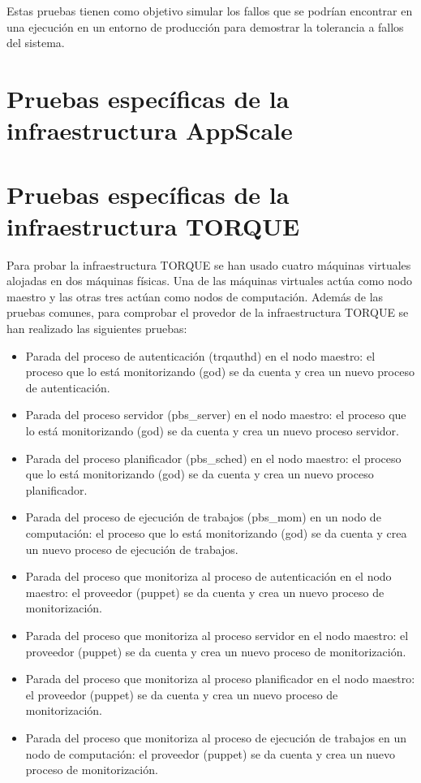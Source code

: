 Estas pruebas tienen como objetivo simular los fallos que se podrían encontrar en una ejecución en un entorno de producción para demostrar la tolerancia a fallos del sistema.


\section{Pruebas específicas de la infraestructura AppScale}


\section{Pruebas específicas de la infraestructura TORQUE}

Para probar la infraestructura TORQUE se han usado cuatro máquinas virtuales alojadas en dos máquinas físicas. Una de las máquinas virtuales actúa como nodo maestro y las otras tres actúan como nodos de computación. Además de las pruebas comunes, para comprobar el provedor de la infraestructura TORQUE se han realizado las siguientes pruebas:

\begin{itemize}
\item Parada del proceso de autenticación (trqauthd) en el nodo maestro: el proceso que lo está monitorizando (god) se da cuenta y crea un nuevo proceso de autenticación.
\item Parada del proceso servidor (pbs\_server) en el nodo maestro: el proceso que lo está monitorizando (god) se da cuenta y crea un nuevo proceso servidor.
\item Parada del proceso planificador (pbs\_sched) en el nodo maestro: el proceso que lo está monitorizando (god) se da cuenta y crea un nuevo proceso planificador.
\item Parada del proceso de ejecución de trabajos (pbs\_mom) en un nodo de computación: el proceso que lo está monitorizando (god) se da cuenta y crea un nuevo proceso de ejecución de trabajos.
\item Parada del proceso que monitoriza al proceso de autenticación en el nodo maestro: el proveedor (puppet) se da cuenta y crea un nuevo proceso de monitorización.
\item Parada del proceso que monitoriza al proceso servidor en el nodo maestro: el proveedor (puppet) se da cuenta y crea un nuevo proceso de monitorización.
\item Parada del proceso que monitoriza al proceso planificador en el nodo maestro: el proveedor (puppet) se da cuenta y crea un nuevo proceso de monitorización.
\item Parada del proceso que monitoriza al proceso de ejecución de trabajos en un nodo de computación: el proveedor (puppet) se da cuenta y crea un nuevo proceso de monitorización.
\end{itemize}


